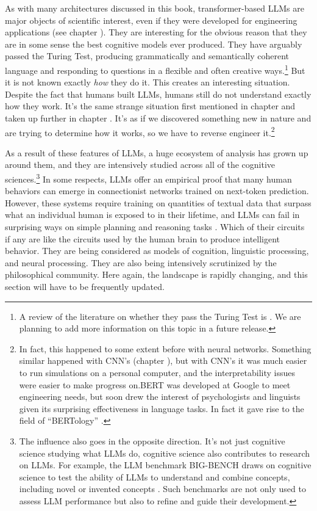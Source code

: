 As with many architectures discussed in this book, transformer-based LLMs are
major objects of scientific interest, even if they were developed for
engineering applications (see chapter ). They are
interesting for the obvious reason that they are in some sense the best
cognitive models ever produced. They have arguably passed the Turing Test,
producing grammatically and semantically coherent language and responding to
questions in a flexible and often creative ways.\footnote{A review of the
literature on whether they pass the Turing Test is \cite{jones2024does}. We are
planning to add more information on this topic in a future release.} But it is
not known exactly \emph{how} they do it. This creates an interesting situation.
Despite the fact that humans built LLMs, humans still do not understand exactly
how they work. It's the same strange situation first mentioned in chapter
 and taken up further in chapter
. It's as if we discovered something new in nature and
are trying to determine how it works, so we have to  reverse engineer
it.\footnote{In fact, this happened  to some extent before with neural
networks. Something similar happened with CNN's (chapter ), but
with CNN's it was much easier to  run simulations on a personal computer, and
the interpretability issues were easier to make progress on.BERT was developed
at Google to meet engineering needs, but soon drew the interest of
psychologists and linguists given its surprising effectiveness in language
tasks. In fact it gave rise to the field of  ``BERTology''
\cite{rogers2020primer}.}

As a result of these features of LLMs, a huge ecosystem of analysis has grown
up around them, and they are intensively studied across all of the cognitive
sciences.\footnote{The influence also goes in the opposite direction. It's not
just cognitive science studying what LLMs do, cognitive science also
contributes to research on LLMs. For example, the LLM benchmark BIG-BENCH draws
on cognitive science to test the ability of LLMs to understand and combine
concepts, including novel or invented concepts \cite{srivastava2022beyond}.
Such benchmarks are not only used to assess LLM performance but also to refine
and guide their development.} In some respects, LLMs offer an empirical proof
that many human behaviors can emerge in connectionist networks trained on
next-token prediction. However, these systems require training on quantities of
textual data that surpass what an individual human is exposed to in their
lifetime, and LLMs can fail in surprising ways on simple planning and reasoning
tasks \cite{momennejad2023cogeval}. Which of their circuits if any are like the
circuits used by the human brain to produce intelligent behavior. They are
being considered as models of cognition, linguistic processing, and neural
processing. They are also being intensively scrutinized by the philosophical
community. Here again, the landscape is rapidly changing, and this section will
have to be frequently updated.

